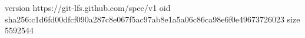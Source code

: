 version https://git-lfs.github.com/spec/v1
oid sha256:c1d6fd00dfcf090a287c8e067f5ac97ab8e1a5a06c86ca98e6f0e49673726023
size 5592544
